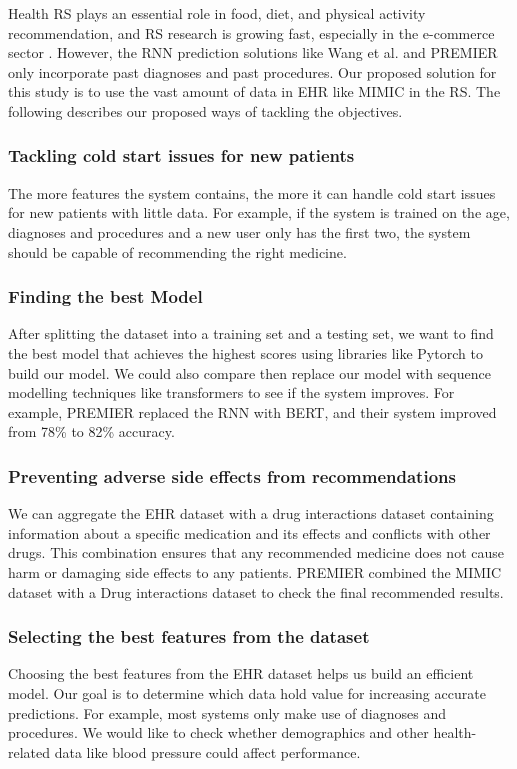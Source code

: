 \label{Proposed}

Health RS plays an essential role in food, diet, and physical activity
recommendation, and RS research is growing fast, especially in the e-commerce
sector \cite{Tran2021b}. However, the RNN prediction solutions
like Wang et al. \cite{Wang} and PREMIER \cite{Bhoi2021} only incorporate past diagnoses and past
procedures. Our proposed solution for this study is to use the vast amount of
data in EHR like MIMIC in the RS.  The following describes our proposed ways of
tackling the objectives.


\subsubsection{
    Tackling cold start issues for new patients
}

The more features the system contains, the more it can handle cold start issues
for new patients with little data. For example, if the system is trained on the
age, diagnoses and procedures and a new user only has the first two, the system
should be capable of recommending the right medicine. 

\subsubsection{
Finding the best Model
}
After splitting the dataset into a training set and a
testing set, we want to find the best model that
achieves the highest scores using libraries like Pytorch
to build our model. We could also compare then replace
our model with sequence modelling techniques like
transformers to see if the system improves. For example,
PREMIER \cite{Bhoi2021} replaced the RNN with BERT, and
their system improved from 78\% to 82\% accuracy.

\subsubsection{
    Preventing adverse side effects from recommendations
}
We can aggregate the EHR dataset with a drug interactions dataset containing
information about a specific medication and its effects and conflicts with
other drugs. This combination ensures that any recommended medicine does not
cause harm or damaging side effects to any patients.
PREMIER \cite{Bhoi2021} combined the MIMIC dataset with a
Drug interactions dataset to check the final recommended
results.

\subsubsection{
    Selecting the best features from the dataset
}
Choosing the best features from the EHR dataset helps us build an efficient
model. Our goal is to determine which data hold value for increasing accurate
predictions. For example, most systems only make use of
diagnoses and procedures. We would like to check whether
demographics and other health-related data like blood
pressure could affect performance.

